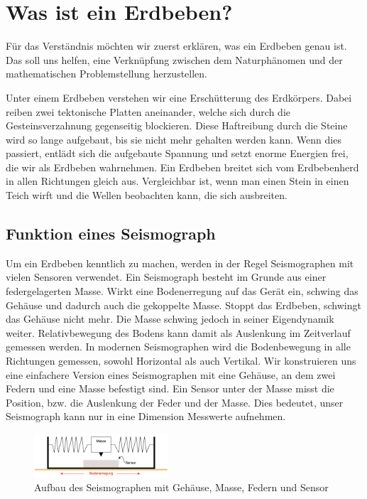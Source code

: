 %
%
\section{Was ist ein Erdbeben? \label{erdbeben:section:teil0}}
Für das Verständnis möchten wir zuerst erklären, was ein Erdbeben genau ist.
Das soll uns helfen, eine Verknüpfung zwischen dem Naturphänomen und der mathematischen Problemstellung herzustellen.

Unter einem Erdbeben verstehen wir eine Erschütterung des Erdkörpers.
Dabei reiben zwei tektonische Platten aneinander, welche sich durch die Gesteinsverzahnung gegenseitig blockieren.
Diese Haftreibung durch die Steine wird so lange aufgebaut, bis sie nicht mehr gehalten werden kann.
Wenn dies passiert, entlädt sich die aufgebaute Spannung und setzt enorme Energien frei, die wir als Erdbeben wahrnehmen.
Ein Erdbeben breitet sich vom Erdbebenherd in allen Richtungen gleich aus.
Vergleichbar ist, wenn man einen Stein in einen Teich wirft und die Wellen beobachten kann, die sich ausbreiten.

\subsection{Funktion eines Seismograph}
Um ein Erdbeben kenntlich zu machen, werden in der Regel Seismographen mit vielen Sensoren verwendet. 
Ein Seismograph besteht im Grunde aus einer federgelagerten Masse. Wirkt eine Bodenerregung auf das Gerät ein, schwing das Gehäuse und dadurch auch die gekoppelte Masse. 
Stoppt das Erdbeben, schwingt das Gehäuse nicht mehr. 
Die Masse schwing jedoch in seiner Eigendynamik weiter. 
Relativbewegung des Bodens kann damit als Auslenkung im Zeitverlauf gemessen werden.
In modernen Seismographen wird die Bodenbewegung in alle Richtungen gemessen, sowohl Horizontal als auch Vertikal. 
Wir konstruieren uns eine einfachere Version eines Seismographen mit eine Gehäuse, an dem zwei Federn und eine Masse befestigt sind. 
Ein Sensor unter der Masse misst die Position, bzw. die Auslenkung der Feder und der Masse.
Dies bedeutet, unser Seismograph kann nur in eine Dimension Messwerte aufnehmen. 

\begin{figure}
 \begin{center}
 \includegraphics[width=5cm]{papers/erdbeben/Apperatur}
 \caption{Aufbau des Seismographen mit Gehäuse, Masse, Federn und Sensor}
 \end{center}
\end{figure}

